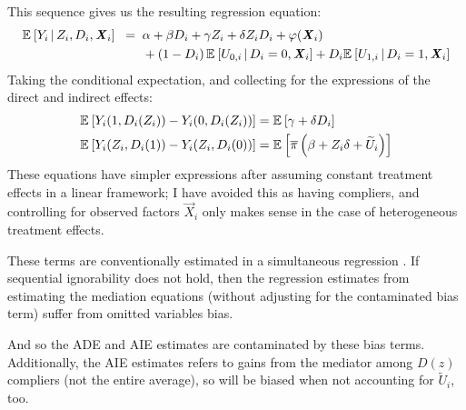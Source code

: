 This sequence gives us the resulting regression equation:
\begin{align*}
    \mathbb{E}_{} \left[ Y_i \, \middle\vert \, Z_i, D_i, \boldsymbol{\mathit{X}}_i \right] \;\; =& \;\;
        \alpha
        + \beta D_i
        + \gamma Z_i
        + \delta Z_i D_i
        + \varphi(\boldsymbol{\mathit{X}}_i) \\
        & \;\; +\left( 1 - D_i \right) \mathbb{E}_{} \left[  U_{0,i}  \, \middle\vert \, D_i = 0, \boldsymbol{\mathit{X}}_i \right]
            + D_i \mathbb{E}_{} \left[  U_{1,i}  \, \middle\vert \, D_i = 1, \boldsymbol{\mathit{X}}_i \right]
\end{align*}
Taking the conditional expectation, and collecting for the expressions of the direct and indirect effects:
\begin{align*}
    \mathbb{E}_{} \left[ Y_i(1, D_i(Z_i)) - Y_i(0, D_i(Z_i)) \right]
        &= \mathbb{E}_{} \left[ \gamma + \delta D_i \right] \\
    \mathbb{E}_{} \left[ Y_i(Z_i, D_i(1)) - Y_i(Z_i, D_i(0)) \right]
        &= \mathbb{E}_{} \left[ \overline{\pi} \left( \beta +  Z_i \delta + \widetilde{U}_i \right) \right]
\end{align*}
These equations have simpler expressions after assuming constant treatment effects in a linear framework;
I have avoided this as having compliers, and controlling for observed factors $\vec X_i$ only makes sense in the case of heterogeneous treatment effects.

These terms are conventionally estimated in a simultaneous regression \citep{imai2010identification}.
If sequential ignorability does not hold, then the regression estimates from estimating the mediation equations (without adjusting for the contaminated bias term) suffer from omitted variables bias.

And so the ADE and AIE estimates are contaminated by these bias terms.
Additionally, the AIE estimates refers to gains from the mediator among $D(z)$ compliers (not the entire average), so will be biased when not accounting for $\tilde U_i$, too.

